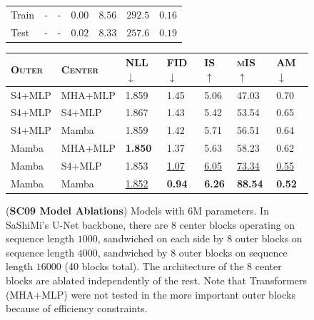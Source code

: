 \begin{figure}[!ht]
\begin{minipage}[t]{.50\linewidth}
\begin{tabular}{@{}lllllll@{}}
      \midrule
      Train          & -               & -                         & $0.00$                    & $8.56$                 & $292.5$                 & $0.16$                                \\
      Test           & -               & -                         & $0.02$                    & $8.33$                 & $257.6$                 & $0.19$                                \\
      \bottomrule
    \end{tabular}
    \label{tab:sc09}
  \end{minipage}
  \hfill
  \begin{minipage}[t]{.49\linewidth}
    \centering
    \captionsetup{type=table}
    \caption{
      (\textbf{SC09 Model Ablations}) Models with 6M parameters. In SaShiMi's U-Net backbone, there are 8 center blocks operating on sequence length $1000$, sandwiched on each side by 8 outer blocks on sequence length $4000$, sandwiched by 8 outer blocks on sequence length $16000$ (40 blocks total). The architecture of the 8 center blocks are ablated independently of the rest. Note that Transformers (MHA+MLP) were not tested in the more important outer blocks because of efficiency constraints.
    }
    \scriptsize
    \begin{tabular}{@{}lllllll@{}}
      \toprule
      \textsc{Outer} & \textsc{Center} & \textsc{NLL $\downarrow$} & \textsc{FID $\downarrow$} & \textsc{IS $\uparrow$} & \textsc{mIS $\uparrow$} & \textsc{AM $\downarrow$}      \\
      \midrule
      S4+MLP         & MHA+MLP         & 1.859                     & 1.45                      & 5.06                   & 47.03                   & 0.70 \\
      S4+MLP         & S4+MLP          & 1.867                     & 1.43                      & 5.42                   & 53.54                   & 0.65 \\
      S4+MLP         & Mamba           & 1.859                     & 1.42                      & 5.71                   & 56.51                   & 0.64 \\
      Mamba          & MHA+MLP         & \textbf{1.850}            & 1.37                      & 5.63                   & 58.23                   & 0.62 \\
      Mamba          & S4+MLP          & 1.853                     & \underline{1.07}          & \underline{6.05}       & \underline{73.34}       & \underline{0.55} \\
      Mamba          & Mamba           & \underline{1.852}         & \textbf{0.94}             & \textbf{6.26}          & \textbf{88.54}          & \textbf{0.52} \\
      \bottomrule
    \end{tabular}
    \label{tab:sc09-ablations}
  \end{minipage}
\end{figure}


